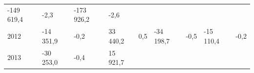 \begin{longtable}[]{@{}lllllllll@{}}
\begin{minipage}[t]{0.12\columnwidth}
-149 619,4\strut
\end{minipage} & \begin{minipage}[t]{0.06\columnwidth}\raggedright
-2,3\strut
\end{minipage} & \begin{minipage}[t]{0.09\columnwidth}\raggedright
-173 926,2\strut
\end{minipage} & \begin{minipage}[t]{0.06\columnwidth}\raggedright
-2,6\strut
\end{minipage}\tabularnewline
\begin{minipage}[t]{0.05\columnwidth}\raggedright
2012\strut
\end{minipage} & \begin{minipage}[t]{0.10\columnwidth}\raggedright
-14 351,9\strut
\end{minipage} & \begin{minipage}[t]{0.06\columnwidth}\raggedright
-0,2\strut
\end{minipage} & \begin{minipage}[t]{0.16\columnwidth}\raggedright
33 440,2\strut
\end{minipage} & \begin{minipage}[t]{0.06\columnwidth}\raggedright
0,5\strut
\end{minipage} & \begin{minipage}[t]{0.12\columnwidth}\raggedright
-34 198,7\strut
\end{minipage} & \begin{minipage}[t]{0.06\columnwidth}\raggedright
-0,5\strut
\end{minipage} & \begin{minipage}[t]{0.09\columnwidth}\raggedright
-15 110,4\strut
\end{minipage} & \begin{minipage}[t]{0.06\columnwidth}\raggedright
-0,2\strut
\end{minipage}\tabularnewline
\begin{minipage}[t]{0.05\columnwidth}\raggedright
2013\strut
\end{minipage} & \begin{minipage}[t]{0.10\columnwidth}\raggedright
-30 253,0\strut
\end{minipage} & \begin{minipage}[t]{0.06\columnwidth}\raggedright
-0,4\strut
\end{minipage} & \begin{minipage}[t]{0.16\columnwidth}\raggedright
15 921,7\strut

\end{minipage}
\end{longtable}
